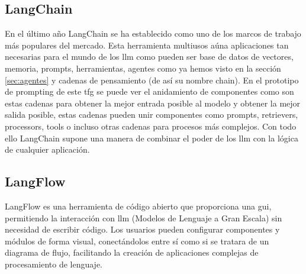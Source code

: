 	\subsection{LangChain}
	En el último año LangChain se ha establecido como uno de los marcos de trabajo más populares del mercado. Esta herramienta multiusos aúna aplicaciones tan necesarias para el mundo de los \acrfull{llm} como pueden ser base de datos de vectores, memoria, prompts, herramientas, agentes como ya hemos visto en la sección \ref{sec:agentes} y cadenas de pensamiento (de así su nombre chain). En el prototipo de prompting de este \acrshort{tfg} se puede ver el anidamiento de componentes como son estas cadenas para obtener la mejor entrada posible al modelo y obtener la mejor salida posible, estas cadenas pueden unir componentes como prompts, retrievers, processors, tools o incluso otras cadenas para procesos más complejos.
	Con todo ello LangChain supone una manera de combinar el poder de los \acrshort{llm} con la lógica de cualquier aplicación.
	
	\subsection{LangFlow}
	LangFlow es una herramienta de código abierto que proporciona una \acrfull{gui}, permitiendo la interacción con \acrlong{llm} (Modelos de Lenguaje a Gran Escala) sin necesidad de escribir código. Los usuarios pueden configurar componentes y módulos de forma visual, conectándolos entre sí como si se tratara de un diagrama de flujo, facilitando la creación de aplicaciones complejas de procesamiento de lenguaje.
	
